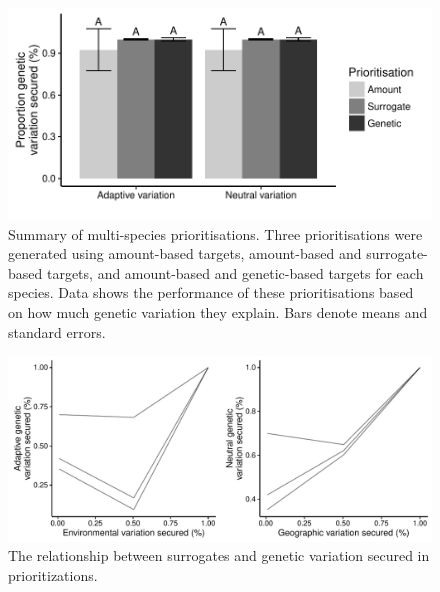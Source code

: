 \documentclass[11pt,]{article}
\begin{document}
\begin{figure}[htbp]
\centering
\includegraphics{figures_files/figure-latex/unnamed-chunk-4-1.pdf}
\caption{Summary of multi-species prioritisations. Three prioritisations
were generated using amount-based targets, amount-based and
surrogate-based targets, and amount-based and genetic-based targets for
each species. Data shows the performance of these prioritisations based
on how much genetic variation they explain. Bars denote means and
standard errors.}
\end{figure}

\begin{figure}[htbp]
\centering
\includegraphics{figures_files/figure-latex/unnamed-chunk-5-1.pdf}
\caption{The relationship between surrogates and genetic variation
secured in prioritizations.}
\end{figure}
\end{document}
